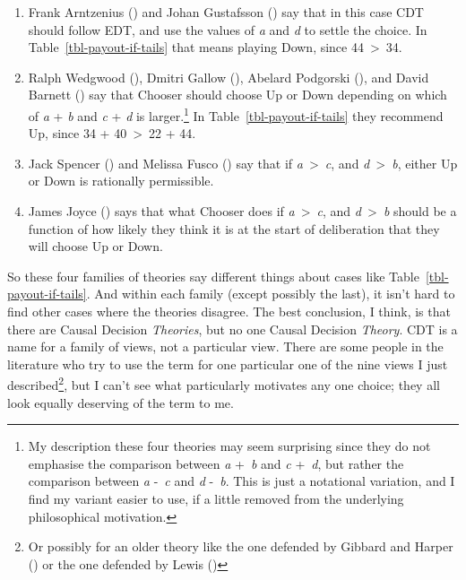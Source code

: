 \documentclass[
  11pt,
  letterpaper,
  DIV=11,
  numbers=noendperiod,
  twoside]{scrartcl}
\providecommand{\tightlist}{%
  \setlength{\itemsep}{0pt}\setlength{\parskip}{0pt}}
\begin{document}
\begin{enumerate}
\def\labelenumi{\arabic{enumi}.}
\tightlist
\item
  Frank Arntzenius () and Johan
  Gustafsson () say that in this case
  CDT should follow EDT, and use the values of \emph{a} and \emph{d} to
  settle the choice. In Table~\ref{tbl-payout-if-tails} that means
  playing Down, since 44~\textgreater~34.
\item
  Ralph Wedgwood (), Dmitri Gallow
  (), Abelard Podgorski
  (), and David Barnett
  () say that Chooser should choose Up
  or Down depending on which of \emph{a} + \emph{b} and \emph{c} +
  \emph{d} is larger.\footnote{My description these four theories may
    seem surprising since they do not emphasise the comparison between
    \emph{a} +~\emph{b} and \emph{c} +~\emph{d}, but rather the
    comparison between \emph{a} -~\emph{c} and \emph{d} -~\emph{b}. This
    is just a notational variation, and I find my variant easier to use,
    if a little removed from the underlying philosophical motivation.}
  In Table~\ref{tbl-payout-if-tails} they recommend Up, since 34 +
  40~\textgreater~22 + 44.
\item
  Jack Spencer () and Melissa Fusco
  () say that if
  \emph{a}~\textgreater~\emph{c}, and \emph{d}~\textgreater~\emph{b},
  either Up or Down is rationally permissible.
\item
  James Joyce () says that what Chooser
  does if \emph{a}~\textgreater~\emph{c}, and
  \emph{d}~\textgreater~\emph{b} should be a function of how likely they
  think it is at the start of deliberation that they will choose Up or
  Down.
\end{enumerate}

So these four families of theories say different things about cases like
Table~\ref{tbl-payout-if-tails}. And within each family (except possibly
the last), it isn't hard to find other cases where the theories
disagree. The best conclusion, I think, is that there are Causal
Decision \emph{Theories}, but no one Causal Decision \emph{Theory}. CDT
is a name for a family of views, not a particular view. There are some
people in the literature who try to use the term for one particular one
of the nine views I just described\footnote{Or possibly for an older
  theory like the one defended by Gibbard and Harper
  () or the one defended by Lewis
  ()}, but I can't see what
particularly motivates any one choice; they all look equally deserving
of the term to me.
\end{document}
